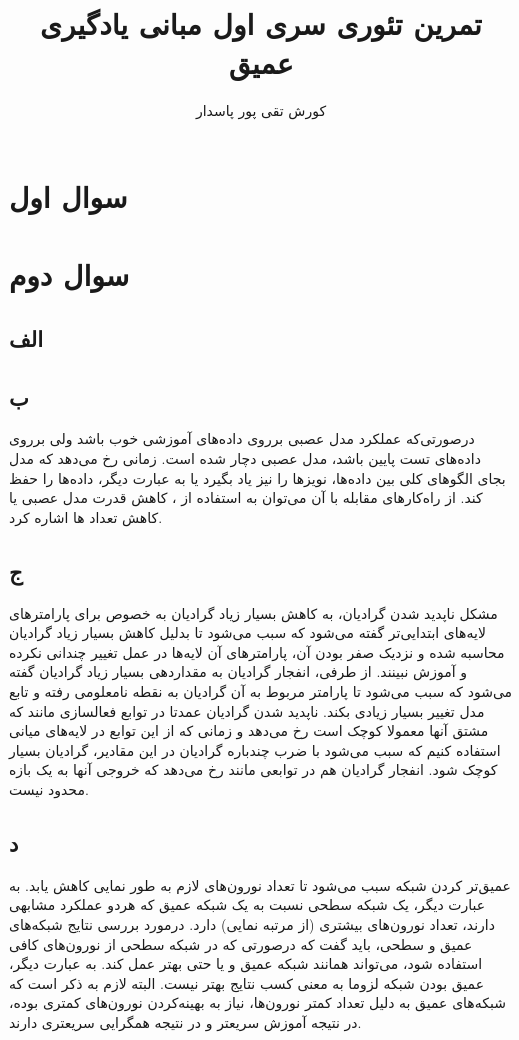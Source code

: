 \documentclass[12pt]{article}
\title{تمرین تئوری سری اول مبانی یادگیری عمیق}
\author{کورش تقی پور پاسدار 
	\lr{400521207}}
\begin{document}
	\maketitle
	\tableofcontents
	\section{سوال اول}
	\section{سوال دوم}
	\subsection{الف}
	\subsection{ب}
	درصورتی‌که عملکرد مدل عصبی برروی داده‌های آموزشی خوب باشد ولی برروی داده‌های تست پایین باشد، مدل عصبی دچار  شده است.  زمانی رخ می‌دهد که مدل بجای الگو‌های کلی بین داده‌ها، نویزها را نیز یاد بگیرد یا به عبارت دیگر، داده‌ها را حفظ کند. از راه‌کارهای مقابله با آن می‌توان به استفاده از ، کاهش قدرت مدل عصبی یا کاهش تعداد  ها اشاره کرد.
	\subsection{ج}
	مشکل ناپدید شدن گرادیان، به کاهش بسیار زیاد گرادیان به خصوص برای پارامترهای لایه‌های ابتدایی‌تر گفته می‌شود که سبب می‌شود تا بدلیل کاهش بسیار زیاد گرادیان محاسبه شده و نزدیک صفر بودن آن، پارامترهای آن لایه‌ها در عمل تغییر چندانی نکرده و آموزش نبینند. از طرفی، انفجار گرادیان به مقداردهی بسیار زیاد گرادیان گفته می‌شود که سبب می‌شود تا پارامتر مربوط به آن گرادیان به نقطه نامعلومی رفته و تابع مدل تغییر بسیار زیادی بکند. 
	\newline
	ناپدید شدن گرادیان عمدتا در توابع فعالسازی مانند  که مشتق آنها معمولا کوچک است رخ می‌دهد و زمانی که از این توابع در لایه‌های میانی استفاده کنیم که سبب می‌شود با ضرب چندباره گرادیان در این مقادیر، گرادیان بسیار کوچک شود.
	\newline
	انفجار گرادیان هم در توابعی مانند  رخ می‌دهد که خروجی آنها به یک بازه محدود نیست. 
	\subsection{د}
	عمیق‌تر کردن شبکه  سبب می‌شود تا تعداد نورون‌های لازم به طور نمایی کاهش یابد. به عبارت دیگر، یک شبکه  سطحی  نسبت به یک شبکه عمیق  که هردو عملکرد مشابهی دارند، تعداد نورون‌های بیشتری (از مرتبه نمایی) دارد.
	\newline
	درمورد بررسی نتایج شبکه‌های عمیق و سطحی، باید گفت که درصورتی که در شبکه سطحی از نورون‌های کافی استفاده شود، می‌تواند همانند شبکه عمیق و یا حتی بهتر عمل کند. به عبارت دیگر، عمیق بودن شبکه لزوما به معنی کسب نتایج بهتر نیست. البته لازم به ذکر است که شبکه‌های عمیق به دلیل تعداد کمتر نورون‌ها،‌ نیاز به بهینه‌کردن نورون‌های کمتری بوده، در نتیجه آموزش سریعتر و در نتیجه همگرایی  سریعتری دارند.
\end{document}
